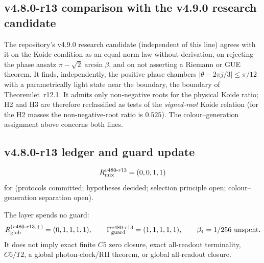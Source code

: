 \subsection*{v4.8.0-r13 comparison with the v4.9.0 research candidate}
\label{subsec:v480-r13-v49}

The repository's v4.9.0 research candidate (independent of this line) agrees with it on the Koide condition as an
equal-norm law without derivation, on rejecting the phase ansatz \(\pi-\sqrt2\arcsin\beta\), and on not
asserting a Riemann or GUE theorem.  It finds, independently, the positive phase chambers
\(|\theta-2\pi j/3|\le\pi/12\) with a parametrically light state near the boundary, the boundary of
Theoremlet~r12.1.  It admits only non-negative roots for the physical Koide ratio; H2 and H3 are therefore
reclassified as tests of the \emph{signed-root} Koide relation (for the H2 masses the non-negative-root ratio is
\(0.525\)).  The colour--generation assignment above concerns both lines.

\subsection*{v4.8.0-r13 ledger and guard update}
\label{subsec:v480-r13-ledger-guard}

\[
R_{\rm mix}^{v480\text{-}r13}=(0,0,1,1)
\]
for (protocols committed; hypotheses decided; selection principle open; colour--generation separation open).

The layer spends no guard:
\[
R_{\rm glob}^{(v480\text{-}r13,+)}=(0,1,1,1,1),
\qquad
\Gamma_{\rm guard}^{v480\text{-}r13}=(1,1,1,1,1),
\qquad
\beta_4=1/256\ \text{unspent}.
\]
It does not imply exact finite \(C5\) zero closure, exact all-readout terminality,
\(C6/T2\), a global photon-clock/RH theorem, or global all-readout closure.
